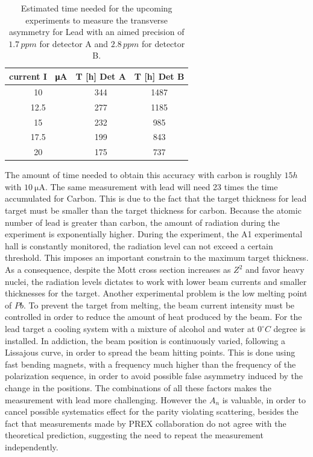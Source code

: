 \begin{table}[h]
\centering
\begin{tabular}{c|c|c}
\hline
   current I \SI{}{\micro \ampere} &   T [h] Det A &   T [h] Det B \\
\hline
        10   &       344 &      1487  \\
        12.5 &       277 &      1185   \\
        15   &       232 &      985 \\
        17.5 &       199 &      843 \\
        20   &       175 &      737 \\
\hline
\end{tabular}
\caption{Estimated time needed for the upcoming experiments to measure the transverse asymmetry for Lead with an aimed precision of $1.7 \, ppm$ for detector A and $2.8 \, ppm$ for detector B.}
\end{table}

The amount of time needed to obtain this accuracy with carbon is roughly $15 h$ with $\SI{10}{\micro \ampere}$. The same measurement with lead will need 23 times the time accumulated for Carbon. This is due to the fact that the target thickness for lead target must be smaller than the target thickness for carbon. Because the atomic number of lead is greater than carbon, the amount of radiation during the experiment is exponentially higher. During the experiment, the A1 experimental hall is constantly monitored, the radiation level can not exceed a certain threshold. This imposes an important constrain to the maximum target thickness. As a consequence, despite the Mott cross section increases as $Z^{2}$ and favor heavy nuclei, the radiation levels dictates to work with lower beam currents and smaller thicknesses for the target. Another experimental problem is the low melting point of $Pb$. To prevent the target from melting, the beam current intensity must be controlled in order to reduce the amount of heat produced by the beam. For the lead target a cooling system with a mixture of alcohol and water at $0^{\circ} C$  degree is installed. In addiction, the beam position is continuously varied, following a Lissajous curve, in order to spread the beam hitting points. This is done using fast bending magnets, with a frequency much higher than the frequency of the polarization sequence, in order to avoid possible false asymmetry induced by the change in the positions. The combinations of all these factors makes the measurement with lead more challenging. However the $A_{n}$ is valuable, in order to cancel possible systematics effect for the parity violating scattering, besides the fact that measurements made by PREX collaboration \cite{HAPPEX:2012fud} do not agree with the theoretical prediction, suggesting the need to repeat the measurement independently. 




